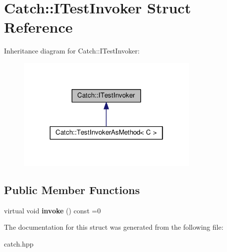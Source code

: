 \hypertarget{structCatch_1_1ITestInvoker}{}\section{Catch\+:\+:I\+Test\+Invoker Struct Reference}
\label{structCatch_1_1ITestInvoker}


Inheritance diagram for Catch\+:\+:I\+Test\+Invoker\+:\nopagebreak
\begin{figure}[H]
\begin{center}
\leavevmode
\includegraphics[width=250pt]{structCatch_1_1ITestInvoker__inherit__graph}
\end{center}
\end{figure}
\subsection*{Public Member Functions}
\begin{DoxyCompactItemize}
\item 
virtual void {\bfseries invoke} () const =0\hypertarget{structCatch_1_1ITestInvoker_a6fcd5c5b67d6d5ade6491ff33411ca7f}{}\label{structCatch_1_1ITestInvoker_a6fcd5c5b67d6d5ade6491ff33411ca7f}

\end{DoxyCompactItemize}


The documentation for this struct was generated from the following file\+:\begin{DoxyCompactItemize}
\item 
catch.\+hpp\end{DoxyCompactItemize}
